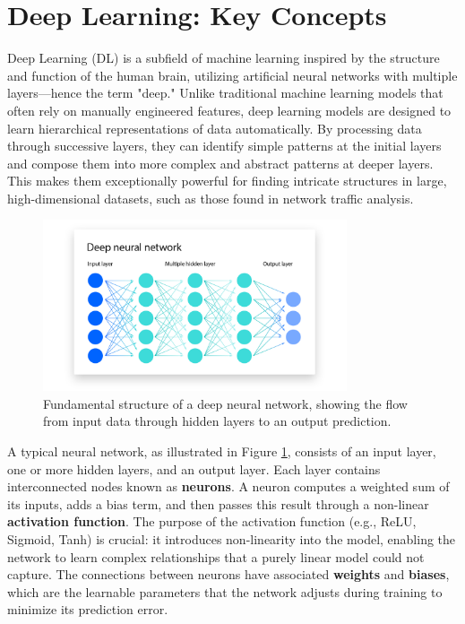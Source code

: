 \documentclass[12pt]{report}
\begin{document}
\section{Deep Learning: Key Concepts}
Deep Learning (DL) is a subfield of machine learning inspired by the structure and function of the human brain, utilizing artificial neural networks with multiple layers—hence the term "deep." Unlike traditional machine learning models that often rely on manually engineered features, deep learning models are designed to learn hierarchical representations of data automatically. By processing data through successive layers, they can identify simple patterns at the initial layers and compose them into more complex and abstract patterns at deeper layers. This makes them exceptionally powerful for finding intricate structures in large, high-dimensional datasets, such as those found in network traffic analysis.

\begin{figure}[H]
    \centering
    \includegraphics[width=0.8\textwidth]{images/deep-learning-graph.png}
    \caption{Fundamental structure of a deep neural network, showing the flow from input data through hidden layers to an output prediction.}
    \label{fig:deep-learning-graph}
\end{figure}

A typical neural network, as illustrated in Figure \ref{fig:deep-learning-graph}, consists of an input layer, one or more hidden layers, and an output layer. Each layer contains interconnected nodes known as \textbf{neurons}. A neuron computes a weighted sum of its inputs, adds a bias term, and then passes this result through a non-linear \textbf{activation function}. The purpose of the activation function (e.g., ReLU, Sigmoid, Tanh) is crucial: it introduces non-linearity into the model, enabling the network to learn complex relationships that a purely linear model could not capture. The connections between neurons have associated \textbf{weights} and \textbf{biases}, which are the learnable parameters that the network adjusts during training to minimize its prediction error.
\end{document}
